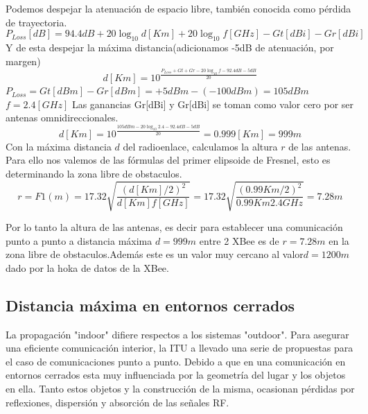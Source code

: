 \documentclass[11pt,oneside,spanish,a4paper]{article}
\begin{document}
Podemos despejar la atenuaci\'on de espacio libre, tambi\'en conocida como p\'erdida de trayectoria\cite{bilb:Free}.
\begin{equation*}
\label{Ec:perdida}
P_{Loss}[dB] = 94.4 dB + 20 \log_{10}d [Km] + 20 \log_{10}f [GHz] - Gt[dBi] - Gr[dBi]
\end{equation*}
Y de esta despejar la m\'axima distancia(adicionamos -5dB de atenuaci\'on, por margen)
\begin{equation*}
\label{Ec:distancia}
d[Km] = 10^{\frac{P_{Loss} + Gt + Gr - 20 \log_{10}f - 92.4dB -5dB}{20}}
\end{equation*}
$P_{Loss}=Gt[dBm] - Gr[dBm] = +5dBm - (-100dBm) = 105dBm$
$f = 2.4 [GHz]$
Las ganancias Gr[dBi] y Gr[dBi] se toman como valor cero por ser antenas omnidireccionales.
\begin{equation*}
\label{Ec:distancia1}
d[Km] = 10^{\frac{105 dBm - 20 \log_{10}2.4 - 92.4dB-5dB}{20}} = 0.999 [Km] =999m
\end{equation*}	
Con la m\'axima distancia $d$ del radioenlace, calculamos la altura $r$ de las antenas. Para ello nos valemos de las f\'ormulas del primer elipsoide de Fresnel, esto es determinando la zona libre de obstaculos\cite{bilb:Fresnel}.
\begin{equation*}
\label{Ec:fresnel}
r = F1(m) = 17.32 \sqrt{\frac{(d[Km]/2)^2}{d[Km]f[GHz]}} = 17.32 \sqrt{\frac{(0.99Km/2)^2}{0.99Km2.4GHz}} = 7.28m
\end{equation*}	

Por lo tanto la altura de las antenas, es decir para establecer una comunicaci\'on punto a punto a distancia m\'axima $d=999m$ entre 2 XBee es de $r=7.28m$ en la zona libre de obstaculos.Adem\'as este es un valor muy cercano al valor$d=1200m$ dado por la hoka de datos de la XBee.

\subsection{Distancia m\'axima en entornos cerrados}

La propagaci\'on "indoor" difiere respectos a los sistemas "outdoor". Para asegurar una eficiente comunicaci\'on interior, la ITU a llevado una serie de propuestas para el caso de comunicaciones punto a punto. Debido a que en una comunicaci\'on en entornos cerrados esta muy influenciada por la geometr\'ia del lugar y los objetos en ella. Tanto estos objetos y la construcci\'on de la misma, ocasionan p\'erdidas por reflexiones, dispersi\'on y absorci\'on de las se\~nales RF.  
\end{document}
